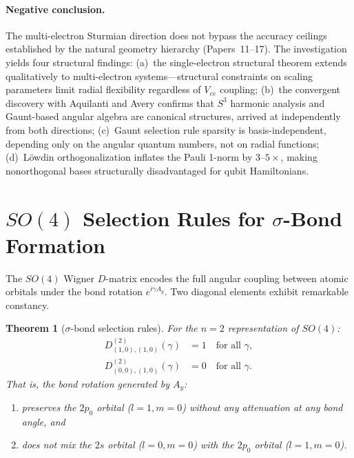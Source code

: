 \documentclass[aps,pra,twocolumn,superscriptaddress,longbibliography]{revtex4-2}
\newtheorem{theorem}{Theorem}
\begin{document}
\paragraph{Negative conclusion.}
The multi-electron Sturmian direction does not bypass the accuracy
ceilings established by the natural geometry hierarchy
(Papers~11--17).  The investigation yields four structural findings:
(a)~the single-electron structural theorem extends qualitatively to
multi-electron systems---structural constraints on scaling parameters
limit radial flexibility regardless of $V_{ee}$ coupling;
(b)~the convergent discovery with Aquilanti and Avery confirms that
$S^3$ harmonic analysis and Gaunt-based angular algebra are
canonical structures, arrived at independently from both directions;
(c)~Gaunt selection rule sparsity is basis-independent, depending only
on the angular quantum numbers, not on radial functions;
(d)~L\"owdin orthogonalization inflates the Pauli 1-norm by
$3$--$5\times$, making nonorthogonal bases structurally disadvantaged
for qubit Hamiltonians.


\section{$SO(4)$ Selection Rules for $\sigma$-Bond Formation}
\label{sec:selection_rules}

The $SO(4)$ Wigner $D$-matrix encodes the full angular coupling between
atomic orbitals under the bond rotation $e^{i\gamma A_y}$.  Two diagonal
elements exhibit remarkable constancy.

\begin{theorem}[$\sigma$-bond selection rules]
\label{thm:selection}
For the $n = 2$ representation of $SO(4)$:
\begin{align}
D^{(2)}_{(1,0),(1,0)}(\gamma) &= 1 \quad \text{for all } \gamma,
\label{eq:D2_1010} \\
D^{(2)}_{(0,0),(1,0)}(\gamma) &= 0 \quad \text{for all } \gamma.
\label{eq:D2_0010}
\end{align}
That is, the bond rotation generated by $A_y$:
\begin{enumerate}
\item preserves the $2p_0$ orbital ($l = 1, m = 0$) without any
attenuation at any bond angle, and
\item does not mix the $2s$ orbital ($l = 0, m = 0$) with the $2p_0$
orbital ($l = 1, m = 0$).
\end{enumerate}
\end{theorem}
\end{document}
